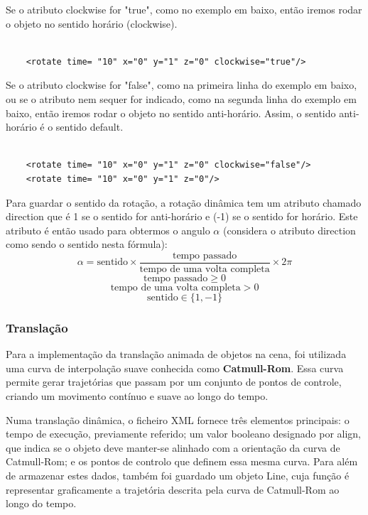 \documentclass[12pt, a4paper]{article}
\begin{document}
Se o atributo clockwise for "true", como no exemplo em baixo, então iremos rodar o objeto no
sentido horário (clockwise).
\lstset{language=xml}
\begin{lstlisting}

    <rotate time= "10" x="0" y="1" z="0" clockwise="true"/>

\end{lstlisting}
Se o atributo clockwise for "false", como na primeira linha do exemplo em baixo, ou se o
atributo nem sequer for indicado, como na segunda linha do exemplo em baixo, então iremos
rodar o objeto no sentido anti-horário. Assim, o sentido anti-horário é o sentido default.
\lstset{language=xml}
\begin{lstlisting}

    <rotate time= "10" x="0" y="1" z="0" clockwise="false"/>
    <rotate time= "10" x="0" y="1" z="0"/>

\end{lstlisting}
Para guardar o sentido da rotação, a rotação dinâmica tem um atributo chamado direction
que é 1 se o sentido for anti-horário e (-1) se o sentido for horário. Este atributo é
então usado para obtermos o angulo $\alpha$ (considera o atributo direction como sendo
o sentido nesta fórmula):
$$
\alpha = \text{sentido} \times \frac{\text{tempo passado}}{\text{tempo de uma volta completa}}
\times 2\pi
$$
$$
$$
$$
\text{tempo passado} \geq 0
$$
$$
\text{tempo de uma volta completa} > 0
$$
$$
\text{sentido} \in \{ 1, -1 \}
$$

\subsubsection{Translação}

Para a implementação da translação animada de objetos na cena, foi utilizada
uma curva de interpolação suave conhecida como \textbf{Catmull-Rom}.
Essa curva permite gerar trajetórias que passam por um conjunto de pontos de
controle, criando um movimento contínuo e suave ao longo do tempo.

Numa translação dinâmica, o ficheiro XML fornece três elementos principais:
o tempo de execução, previamente referido; um valor booleano designado por
align, que indica se o objeto deve manter-se alinhado com a orientação da
curva de Catmull-Rom; e os pontos de controlo que definem essa mesma curva.
Para além de armazenar estes dados, também foi guardado um objeto Line,
cuja função é representar graficamente a trajetória descrita pela curva de
Catmull-Rom ao longo do tempo.
\end{document}
